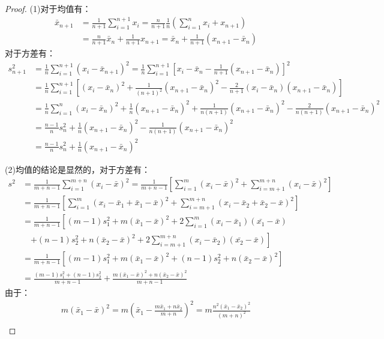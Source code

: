 \begin{proof}
	(1)对于均值有：
	\begin{align*}
		\bar{x}_{n+1}&=\frac{1}{n+1}\sum_{i=1}^{n+1}x_i=\frac{n}{n+1}\frac{1}{n}\left(\sum_{i=1}^{n}x_i+x_{n+1}\right) \\
		&=\frac{n}{n+1}\bar{x}_n+\frac{1}{n+1}x_{n+1}=\bar{x}_n+\frac{1}{n+1}(x_{n+1}-\bar{x}_n)
	\end{align*}
	对于方差有：
	\begin{align*}
		s_{n+1}^2&=\frac{1}{n}\sum_{i=1}^{n+1}(x_i-\bar{x}_{n+1})^2=\frac{1}{n}\sum_{i=1}^{n+1}\left[x_i-\bar{x}_n-\frac{1}{n+1}(x_{n+1}-\bar{x}_n)\right]^2 \\
		&=\frac{1}{n}\sum_{i=1}^{n+1}\left[(x_i-\bar{x}_n)^2+\frac{1}{(n+1)^2}(x_{n+1}-\bar{x}_n)^2-\frac{2}{n+1}(x_i-\bar{x}_n)(x_{n+1}-\bar{x}_n)\right] \\
		&=\frac{1}{n}\sum_{i=1}^{n}(x_i-\bar{x}_n)^2+\frac{1}{n}(x_{n+1}-\bar{x}_n)^2+\frac{1}{n(n+1)}(x_{n+1}-\bar{x}_n)^2-\frac{2}{n(n+1)}(x_{n+1}-\bar{x}_n)^2 \\
		&=\frac{n-1}{n}s_n^2+\frac{1}{n}(x_{n+1}-\bar{x}_n)^2-\frac{1}{n(n+1)}(x_{n+1}-\bar{x}_n)^2 \\
		&=\frac{n-1}{n}s_n^2+\frac{1}{n}(x_{n+1}-\bar{x}_n)^2
	\end{align*}\par
	(2)均值的结论是显然的，对于方差有：
	\begin{align*}
		s^2&=\frac{1}{m+n-1}\sum_{i=1}^{m+n}(x_i-\bar{x})^2=\frac{1}{m+n-1}\left[\sum_{i=1}^{m}(x_i-\bar{x})^2+\sum_{i=m+1}^{m+n}(x_i-\bar{x})^2\right] \\
		&=\frac{1}{m+n-1}\left[\sum_{i=1}^{m}(x_i-\bar{x}_1+\bar{x}_1-\bar{x})^2+\sum_{i=m+1}^{m+n}(x_i-\bar{x}_2+\bar{x}_2-\bar{x})^2\right] \\
		&=\frac{1}{m+n-1}\left[(m-1)s_1^2+m(\bar{x}_1-\bar{x})^2+2\sum_{i=1}^{m}(x_i-\bar{x}_1)(\bar{x_1}-\bar{x})\right. \\
		&\quad\left.+(n-1)s_2^2+n(\bar{x}_2-\bar{x})^2+2\sum_{i=m+1}^{m+n}(x_i-\bar{x}_2)(\bar{x_2}-\bar{x})\right] \\
		&=\frac{1}{m+n-1}\left[(m-1)s_1^2+m(\bar{x}_1-\bar{x})^2+(n-1)s_2^2+n(\bar{x}_2-\bar{x})^2\right] \\
		&=\frac{(m-1)s_1^2+(n-1)s_2^2}{m+n-1}+\frac{m(\bar{x}_1-\bar{x})^2+n(\bar{x}_2-\bar{x})^2}{m+n-1}
	\end{align*}
	由于：
	\begin{gather*}
		m(\bar{x}_1-\bar{x})^2=m\left(\bar{x}_1-\frac{m\bar{x}_1+n\bar{x}_2}{m+n}\right)^2=m\frac{n^2(\bar{x}_1-\bar{x}_2)^2}{(m+n)^2} \\

\end{gather*}
\end{proof}
